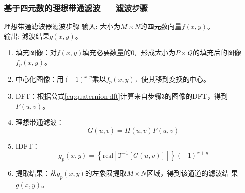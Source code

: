 \documentclass[xcolor=svgnames,serif,table]{beamer}
\begin{document}
\begin{frame}
  \frametitle{基于四元数的理想带通滤波 --- 滤波步骤}
  \scriptsize
  \begin{exampleblock}{理想带通滤波器滤波步骤}
    \textcolor{black!60!green}{输入}: 大小为$M\times N$的四元数向量$f(x,y)$。\\
    \textcolor{black!60!green}{输出}: 滤波结果$g(x,y)$。\\ \vspace{-.5em}
    \begin{enumerate}[(S1)]
    \item 填充图像：对$f(x,y)$填充必要数量的0，形成大小为$P\times Q$的填充后的图像
    $f_{p}(x,y)$。
    \item 中心化图像：用$(-1)^{x,y}$乘以$f_{p}(x,y)$，使其移到变换的中心。
    \item DFT：根据公式\ref{eq:quaternion-dft}计算来自步骤3的图像的DFT，得到$F(u,v)$。
    \item 理想带通滤波：$$G(u,v)=H(u,v)F(u,v)$$
    \item IDFT：$$g_p(x,y)=\left\{
      \mbox{real}[\Im^{-1}[G(u,v)]] \right\}(-1)^{x+y}$$ 
    \item 提取结果：从$g_p(x,y)$的左象限提取$M\times N$区域，得到该通道的滤波结
    果$g(x,y)$。
    \end{enumerate}
  \end{exampleblock}
\end{frame}
\end{document}
